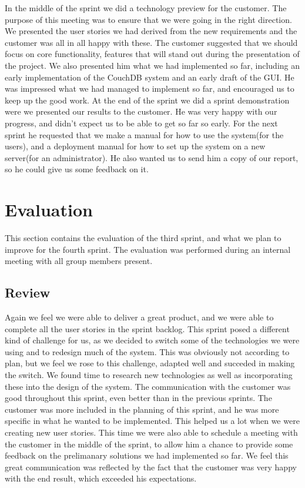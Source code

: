 In the middle of the sprint we did a technology preview for the customer. The purpose of this meeting was to ensure that we were going in the right direction. We presented the user stories we had derived from the new requirements and the customer was all in all happy with these. The customer suggested that we should focus on core functionality, features that will stand out during the presentation of the project. We also presented him what we had implemented so far, including an early implementation of the CouchDB system and an early draft of the GUI. He was impressed what we had managed to implement so far, and encouraged us to keep up the good work. At the end of the sprint we did a sprint demonstration were we presented our results to the customer. He was very happy with our progress, and didn't expect us to be able to get so far so early. For the next sprint he requested that we make a manual for how to use the system(for the users), and a deployment manual for how to set up the system on a new server(for an administrator). He also wanted us to send him a copy of our report, so he could give us some feedback on it.

\section{Evaluation}
This section contains the evaluation of the third sprint, and what we plan to improve for the fourth sprint. The evaluation was performed during an internal meeting with all group members present.

\subsection{Review}
Again we feel we were able to deliver a great product, and we were able to complete all the user stories in the sprint backlog. This sprint posed a different kind of challenge for us, as we decided to switch some of the technologies we were using and to redesign much of the system. This was obviously not according to plan, but we feel we rose to this challenge, adapted well and succeded in making the switch. We found time to research new technologies as well as incorporating these into the design of the system. The communication with the customer was good throughout this sprint, even better than in the previous sprints. The customer was more included in the planning of this sprint, and he was more specific in what he wanted to be implemented. This helped us a lot when we were creating new user stories. This time we were also able to schedule a meeting with the customer in the middle of the sprint, to allow him a chance to provide some feedback on the prelimanary solutions we had implemented so far. We feel this great communication was reflected by the fact that the customer was very happy with the end result, which exceeded his expectations.

